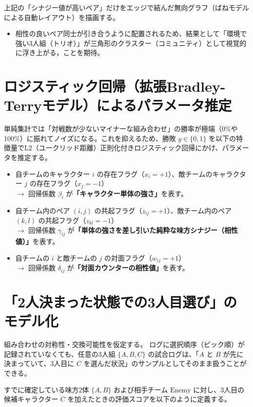 \documentclass[a4paper,11pt]{ltjsarticle}
\begin{document}
上記の「シナジー値が高いペア」だけをエッジで結んだ無向グラフ（ばねモデルによる自動レイアウト）を描画する。

\begin{itemize}
  \item 相性の良いペア同士が引き合うように配置されるため、結果として「環境で強い3人組（トリオ）」が三角形のクラスター（コミュニティ）として視覚的に浮き上がる，ことを期待。
\end{itemize}

\section{ロジスティック回帰（拡張Bradley-Terryモデル）によるパラメータ推定}

単純集計では「対戦数が少ないマイナーな組み合わせ」の勝率が極端（0\%や100\%）に振れてノイズになる。これを抑えるため、勝敗 $y \in \{0, 1\}$ を以下の特徴量でL2（ユークリッド距離）正則化付きロジスティック回帰にかけ、パラメータを推定する。

\begin{itemize}
  \item 自チームのキャラクター $i$ の存在フラグ（$x_i = +1$）、敵チームのキャラクター $j$ の存在フラグ（$x_j = -1$） \\
  $\rightarrow$ 回帰係数 $\beta_i$ が\textbf{「キャラクター単体の強さ」}を表す。
  \item 自チーム内のペア $(i, j)$ の共起フラグ（$z_{ij} = +1$）、敵チーム内のペア $(k, l)$ の共起フラグ（$z_{kl} = -1$） \\
  $\rightarrow$ 回帰係数 $\gamma_{ij}$ が\textbf{「単体の強さを差し引いた純粋な味方シナジー（相性値）」}を表す。
  \item 自チームの $i$ と敵チームの $j$ の対面フラグ（$w_{ij} = +1$） \\
  $\rightarrow$ 回帰係数 $\delta_{ij}$ が\textbf{「対面カウンターの相性値」}を表す。
\end{itemize}

\section{「2人決まった状態での3人目選び」のモデル化}

組み合わせの対称性・交換可能性を仮定する。
ログに選択順序（ピック順）が記録されていなくても、任意の3人組 $\{A, B, C\}$ の試合ログは、「$A$ と $B$ が先に決まっていて、3人目に $C$ を選んだ状況」のサンプルとしてそのまま扱うことができる。

すでに確定している味方2体 $\{A, B\}$ および相手チーム $\mathrm{Enemy}$ に対し、3人目の候補キャラクター $C$ を加えたときの評価スコアを以下のように定義する。
\end{document}
